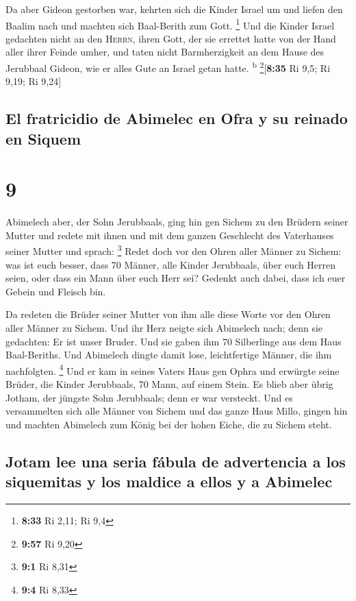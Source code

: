  Da aber Gideon gestorben war, kehrten sich die Kinder
Israel um und liefen den Baalim nach und machten sich Baal-Berith zum
Gott. \footnote{\textbf{8:33} Ri 2,11; Ri 9,4}  Und die
Kinder Israel gedachten nicht an den \textsc{Herrn}, ihren Gott, der sie
errettet hatte von der Hand aller ihrer Feinde umher, 
und taten nicht Barmherzigkeit an dem Hause des Jerubbaal Gideon, wie er
alles Gute an Israel getan hatte. \textsuperscript{b}
\footnote{\textbf{9:57} Ri 9,20}{[}\textbf{8:35} Ri 9,5; Ri 9,19; Ri
9,24{]}

\hypertarget{el-fratricidio-de-abimelec-en-ofra-y-su-reinado-en-siquem}{%
\subsection{El fratricidio de Abimelec en Ofra y su reinado en
Siquem}\label{el-fratricidio-de-abimelec-en-ofra-y-su-reinado-en-siquem}}

\hypertarget{section-8}{%
\section{9}\label{section-8}}

 Abimelech aber, der Sohn Jerubbaals, ging hin gen Sichem
zu den Brüdern seiner Mutter und redete mit ihnen und mit dem ganzen
Geschlecht des Vaterhauses seiner Mutter und sprach: \footnote{\textbf{9:1}
  Ri 8,31}  Redet doch vor den Ohren aller Männer zu
Sichem: was ist euch besser, dass 70 Männer, alle Kinder Jerubbaals,
über euch Herren seien, oder dass ein Mann über euch Herr sei? Gedenkt
auch dabei, dass ich euer Gebein und Fleisch bin.

 Da redeten die Brüder seiner Mutter von ihm alle diese
Worte vor den Ohren aller Männer zu Sichem. Und ihr Herz neigte sich
Abimelech nach; denn sie gedachten: Er ist unser Bruder. 
Und sie gaben ihm 70 Silberlinge aus dem Haus Baal-Beriths. Und
Abimelech dingte damit lose, leichtfertige Männer, die ihm nachfolgten.
\footnote{\textbf{9:4} Ri 8,33}  Und er kam in seines
Vaters Haus gen Ophra und erwürgte seine Brüder, die Kinder Jerubbaals,
70 Mann, auf einem Stein. Es blieb aber übrig Jotham, der jüngste Sohn
Jerubbaals; denn er war versteckt.  Und es versammelten
sich alle Männer von Sichem und das ganze Haus Millo, gingen hin und
machten Abimelech zum König bei der hohen Eiche, die zu Sichem steht.

\hypertarget{jotam-lee-una-seria-fuxe1bula-de-advertencia-a-los-siquemitas-y-los-maldice-a-ellos-y-a-abimelec}{%
\subsection{Jotam lee una seria fábula de advertencia a los siquemitas y
los maldice a ellos y a
Abimelec}\label{jotam-lee-una-seria-fuxe1bula-de-advertencia-a-los-siquemitas-y-los-maldice-a-ellos-y-a-abimelec}}


